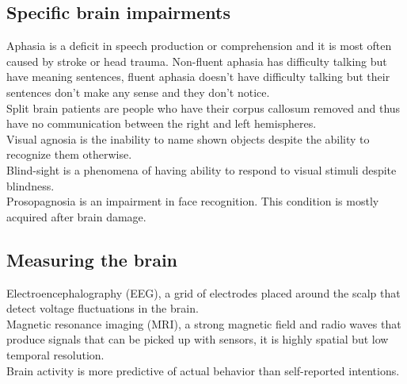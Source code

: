 \documentclass[11pt]{article}
\begin{document}
	\newpage
	\subsection{Specific brain impairments}
	Aphasia is a deficit in speech production or comprehension and it is most often caused by stroke or head trauma. Non-fluent aphasia has difficulty talking but have meaning sentences, fluent aphasia doesn't have difficulty talking but their sentences don't make any sense and they don't notice.\\
	Split brain patients are people who have their corpus callosum removed and thus have no communication between the right and left hemispheres.\\
	Visual agnosia is the inability to name shown objects despite the ability to recognize them otherwise.\\
	Blind-sight is a phenomena of having ability to respond to visual stimuli despite blindness.\\
	Prosopagnosia is an impairment in face recognition. This condition is mostly acquired after brain damage.
	\subsection{Measuring the brain}
	Electroencephalography (EEG), a grid of electrodes placed around the scalp that detect voltage fluctuations in the brain.\\
	Magnetic resonance imaging (MRI), a strong magnetic field and radio waves that produce signals that can be picked up with sensors, it is highly spatial but low temporal resolution.\\
	Brain activity is more predictive of actual behavior than self-reported intentions.
\end{document}
